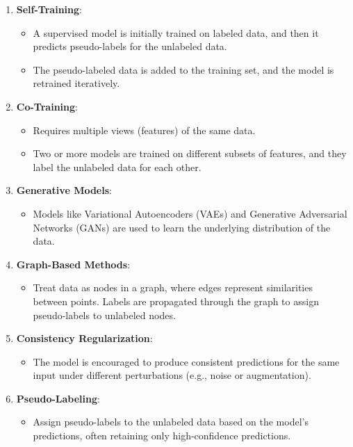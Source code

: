 \begin{enumerate}
    \item \textbf{Self-Training}:
    \begin{itemize}
        \item A supervised model is initially trained on labeled data, and then it predicts pseudo-labels for the unlabeled data.
        \item The pseudo-labeled data is added to the training set, and the model is retrained iteratively.
    \end{itemize}
    \item \textbf{Co-Training}:
    \begin{itemize}
        \item Requires multiple views (features) of the same data.
        \item Two or more models are trained on different subsets of features, and they label the unlabeled data for each other.
    \end{itemize}
    \item \textbf{Generative Models}:
    \begin{itemize}
        \item Models like Variational Autoencoders (VAEs) and Generative Adversarial Networks (GANs) are used to learn the underlying distribution of the data.
    \end{itemize}
    \item \textbf{Graph-Based Methods}:
    \begin{itemize}
        \item Treat data as nodes in a graph, where edges represent similarities between points. Labels are propagated through the graph to assign pseudo-labels to unlabeled nodes.
    \end{itemize}
    \item \textbf{Consistency Regularization}:
    \begin{itemize}
        \item The model is encouraged to produce consistent predictions for the same input under different perturbations (e.g., noise or augmentation).
    \end{itemize}
    \item \textbf{Pseudo-Labeling}:
    \begin{itemize}
        \item Assign pseudo-labels to the unlabeled data based on the model’s predictions, often retaining only high-confidence predictions.
    \end{itemize}
\end{enumerate}

